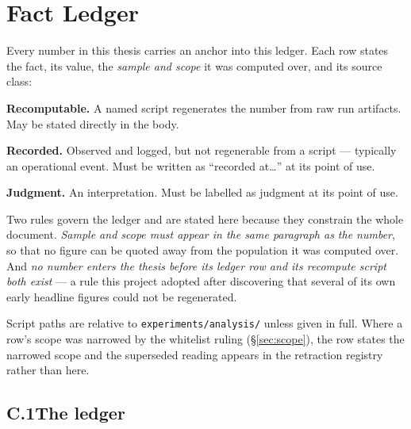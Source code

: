 \chapter{Fact Ledger}
\label{app:ledger}

Every number in this thesis carries an \F{} anchor into this ledger. Each
row states the fact, its value, the \emph{sample and scope} it was computed
over, and its source class:

\begin{description}[leftmargin=3em,style=nextline]
  \item[\textnormal{\cls{A}}] \textbf{Recomputable.} A named script
        regenerates the number from raw run artifacts. May be stated
        directly in the body.
  \item[\textnormal{\cls{B}}] \textbf{Recorded.} Observed and logged, but
        not regenerable from a script --- typically an operational event.
        Must be written as ``recorded at\ldots'' at its point of use.
  \item[\textnormal{\cls{C}}] \textbf{Judgment.} An interpretation. Must be
        labelled as judgment at its point of use.
\end{description}

Two rules govern the ledger and are stated here because they constrain the
whole document. \emph{Sample and scope must appear in the same paragraph as
the number}, so that no figure can be quoted away from the population it
was computed over. And \emph{no number enters the thesis before its ledger
row and its recompute script both exist} --- a rule this project adopted
after discovering that several of its own early headline figures could not
be regenerated.

Script paths are relative to \texttt{experiments/analysis/} unless given in
full. Where a row's scope was narrowed by the whitelist ruling
(\S\ref{sec:scope}), the row states the narrowed scope and the superseded
reading appears in the retraction registry rather than here.

\section*{C.1\quad The ledger}

